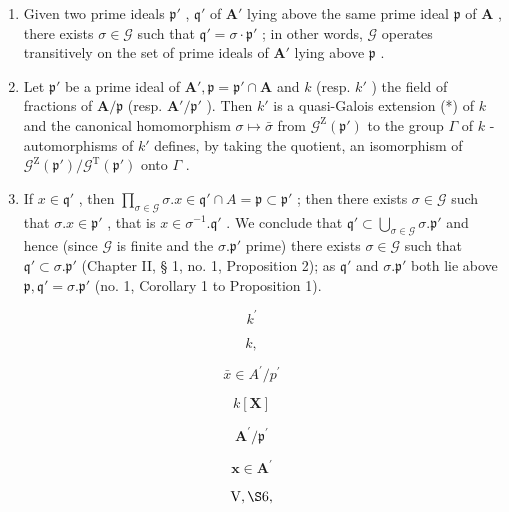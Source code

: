 \begin{enumerate}
\def\labelenumi{(\roman{enumi})}
\item
  Given two prime ideals \(\mathfrak{p}'\) , \(\mathfrak{q}'\) of \(\mathbf{A}'\) lying above the same prime ideal \(\mathfrak{p}\) of \(\mathbf{A}\) , there exists \(\sigma \in \mathcal{G}\) such that \(\mathfrak{q}' = \sigma \cdot \mathfrak{p}'\) ; in other words, \(\mathcal{G}\) operates transitively on the set of prime ideals of \(\mathbf{A}'\) lying above \(\mathfrak{p}\) .
\item
  Let \(\mathfrak{p}'\) be a prime ideal of \(\mathbf{A}', \mathfrak{p} = \mathfrak{p}' \cap \mathbf{A}\) and \(k\) (resp. \(k'\) ) the field of fractions of \(\mathbf{A}/\mathfrak{p}\) (resp. \(\mathbf{A}'/\mathfrak{p}'\) ). Then \(k'\) is a quasi-Galois extension (*) of \(k\) and the canonical homomorphism \(\sigma \mapsto \bar{\sigma}\) from \(\mathcal{G}^{\mathrm{Z}}(\mathfrak{p}')\) to the group \(\Gamma\) of \(k\) -automorphisms of \(k'\) defines, by taking the quotient, an isomorphism of \(\mathcal{G}^{\mathrm{Z}}(\mathfrak{p}') / \mathcal{G}^{\mathrm{T}}(\mathfrak{p}')\) onto \(\Gamma\) .
\setcounter{enumi}{0}
\item
  If \(x \in \mathfrak{q}'\) , then \(\prod_{\sigma \in \mathcal{G}} \sigma. x \in \mathfrak{q}' \cap A = \mathfrak{p} \subset \mathfrak{p}'\) ; then there exists \(\sigma \in \mathcal{G}\) such that \(\sigma. x \in \mathfrak{p}'\) , that is \(x \in \sigma^{-1}. \mathfrak{q}'\) . We conclude that \(\mathfrak{q}' \subset \bigcup_{\sigma \in \mathcal{G}} \sigma. \mathfrak{p}'\) and hence (since \(\mathcal{G}\) is finite and the \(\sigma. \mathfrak{p}'\) prime) there exists \(\sigma \in \mathcal{G}\) such that \(\mathfrak{q}' \subset \sigma. \mathfrak{p}'\) (Chapter II, § 1, no. 1, Proposition 2); as \(\mathfrak{q}'\) and \(\sigma. \mathfrak{p}'\) both lie above \(\mathfrak{p}, \mathfrak{q}' = \sigma. \mathfrak{p}'\) (no. 1, Corollary 1 to Proposition 1).
\end{enumerate}

\iffalse
\[
k ^ {\prime}
\]

\[
k,
\]

\[
\bar {x} \in A ^ {\prime} / p ^ {\prime}
\]

\[
k [ \mathbf {X} ]
\]

\[
\mathbf {A} ^ {\prime} / \mathfrak {p} ^ {\prime}
\]

\[
\boldsymbol {x} \in \mathbf {A} ^ {\prime}
\]

\[
\mathrm{V}, \S 6,
\]

